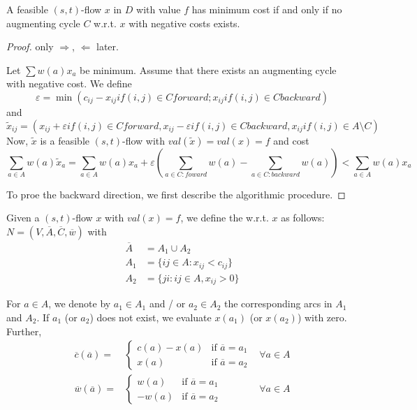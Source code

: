 \begin{thm}\label{thm:thm164}
A feasible $(s,t)$-flow $x$ in $D$ with value $f$ has minimum cost if and
only if no augmenting cycle $C$ w.r.t. $x$ with negative costs exists.
\end{thm}
\begin{proof}
only $\Rightarrow$, $\Leftarrow$ later.

Let $\sum w(a) x_a$ be minimum. Assume that there exists an augmenting cycle
with negative cost. We define
\[
	\varepsilon = \min ( c_{ij} - x_{ij} if (i,j) \in C forward ; x_{ij} if
	(i,j) \in C backward )
\]
and 
\[
	\tilde{x}_{ij} = ( x_{ij} + \varepsilon if (i,j) \in C forward, 
	x_{ij} - \varepsilon if (i,j) \in C backward,
	x_{ij} if (i,j) \in A \setminus C
	)
\]
Now, $\tilde{x}$ is a feasible $(s,t)$-flow with $val(\tilde{x}) = val(x) =
f$ and cost
\[
	\sum_{a \in A} w(a) \tilde{x}_a = \sum_{a \in A} w(a) x_a + \varepsilon
	\left( \sum_{a \in C: foward} w(a) - \sum_{a \in C: backward} w(a) \right)
	< \sum_{a \in A} w(a) x_a
\]

To proe the backward direction, we first describe the algorithmic procedure.
\end{proof}

\begin{defn}
Given a $(s,t)$-flow $x$ with $val(x) = f$, we define the  w.r.t. $x$ as follows: $N = (V, \overline{A}, \overline{C},
\overline{w})$ with
\begin{align*}
\overline{A} &= A_1 \cup A_2 \\
A_1 &= \{ ij \in A: x_{ij} < c_{ij} \} \\
A_2 &= \{ ji: ij \in A, x_{ij} > 0 \}
\end{align*}

For $a \in A$, we denote by $a_1 \in A_1$ and / or $a_2 \in A_2$ the
corresponding arcs in $A_1$ and $A_2$. If $a_1$ (or $a_2$) does not exist,
we evaluate $x(a_1)$ (or $x(a_2)$) with zero.
Further,
\begin{align*}
\overline{c}(\overline{a}) = &
	\begin{cases}
		c(a) - x(a) & \text{if } \overline{a} = a_1 \\
		x(a) & \text{if } \overline{a} = a_2
	\end{cases} & \forall a \in A \\
\overline{w}(\overline{a}) = &
	\begin{cases}
		 w(a) & \text{if } \overline{a} = a_1 \\
		-w(a) & \text{if }\overline{a} = a_2
	\end{cases}   & \forall a \in A
\end{align*}
\end{defn}

